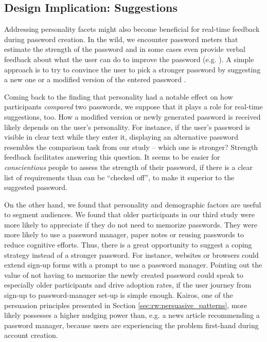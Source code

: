 \subsection{Design Implication: Suggestions}
Addressing personality facets might also become beneficial for real-time feedback during password creation. In the wild, we encounter password meters that estimate the strength of the password and in some cases even provide verbal feedback about what the user can do to improve the password (e.g. \cite{Wheeler2016zxcvbn}). A simple approach is to try to convince the user to pick a stronger password by suggesting a new one or a modified version of the entered password \cite{Forget2008ImprovingPasswordsThroughPersuasion, Seitz2016SuggestionsDecoy, Shay2015SpoonfulOfSugar}. 

Coming back to the finding that personality had a notable effect on how participants \textit{compared} two passwords, we suppose that it plays a role for real-time suggestions, too. How a modified version or newly generated password is received likely depends on the user's personality. For instance, if the user's password is visible in clear text while they enter it, displaying an alternative password resembles the comparison task from our study -- which one is stronger? Strength feedback facilitates answering this question. It seems to be easier for \textit{conscientious} people to assess the strength of their password, if there is a clear list of requirements than can be ``checked off'', to make it superior to the suggested password. 

On the other hand, we found that personality and demographic factors are useful to segment audiences. We found that older participants in our third study were more likely to appreciate if they do not need to memorize passwords. They were more likely to use a password manager, paper notes or reusing passwords to reduce cognitive efforts. Thus, there is a great opportunity to suggest a coping strategy instead of a stronger password. For instance, websites or browsers could extend sign-up forms with a prompt to use a password manager. Pointing out the value of not having to memorize the newly created password could speak to especially older participants and drive adoption rates, if the user journey from sign-up to password-manager set-up is simple enough. Kairos, one of the persuasion principles presented in Section \ref{sec:rw:persuasive_patterns}, more likely possesses a higher nudging power than, e.g. a news article recommending a password manager, because users are experiencing the problem first-hand during account creation. 

